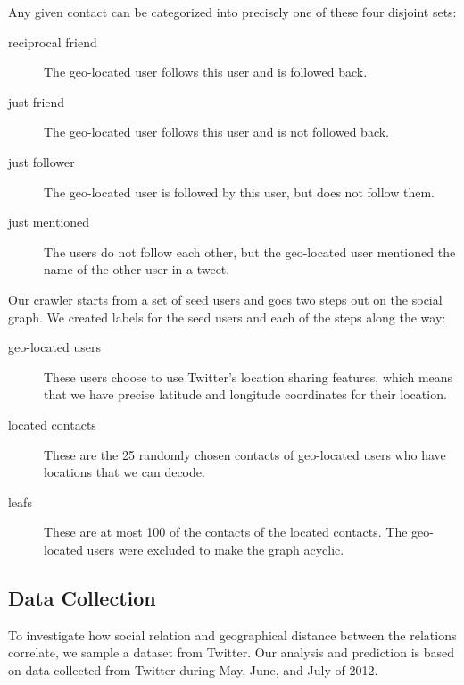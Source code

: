 Any given contact can be categorized into precisely one of these four disjoint
sets:
\begin{description}
\item[reciprocal friend] The geo-located user follows this user and is followed
    back.
\item[just friend] The geo-located user follows this user and is not followed
    back.
\item[just follower] The geo-located user is followed by this user, but does
    not follow them.
\item[just mentioned] The users do not follow each other, but the geo-located
    user mentioned the name of the other user in a tweet.
\end{description}

Our crawler starts from a set of seed users and goes two steps out on the
social graph.
%
We created labels for the seed users and each of the steps along the way:

\begin{description}
\item[geo-located users] These users choose to use Twitter's location sharing
    features, which means that we have precise latitude and longitude
    coordinates for their location.
\item[located contacts] These are the 25 randomly chosen contacts of
    geo-located users who have locations that we can decode.
\item[leafs] These are at most 100 of the contacts of the located contacts.
    The geo-located users were excluded to make the graph acyclic.
\end{description}


\subsection{Data Collection}
To investigate how social relation and geographical distance between the
relations correlate, we sample a dataset from Twitter.
%
Our analysis and prediction is based on data collected from Twitter during
May, June, and July of 2012.

